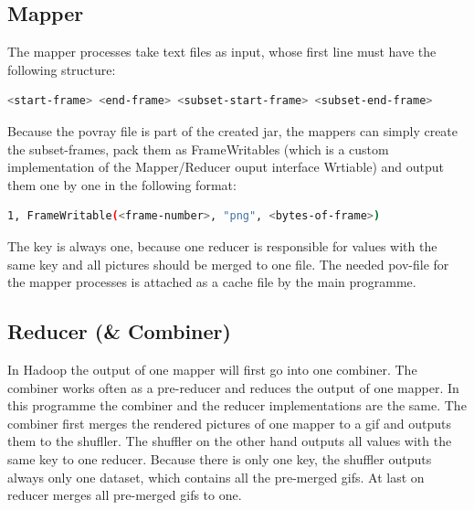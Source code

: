 \documentclass{article}
\begin{document}
\subsection{Mapper}

The mapper processes take text files as input, whose first line must have the following structure:

\begin{lstlisting}[language=bash, deletekeywords={cd}]
  <start-frame> <end-frame> <subset-start-frame> <subset-end-frame>
\end{lstlisting}

Because the povray file is part of the created jar, the mappers can simply create the subset-frames, pack them as FrameWritables (which is a custom implementation of the Mapper/Reducer ouput interface Wrtiable) and output them one by one in the following format:

\begin{lstlisting}[language=bash, deletekeywords={cd}]
  1, FrameWritable(<frame-number>, "png", <bytes-of-frame>)
\end{lstlisting}

The key is always one, because one reducer is responsible for values with the same key and all pictures should be merged to one file.
The needed pov-file for the mapper processes is attached as a cache file by the main programme.

\subsection{Reducer (\& Combiner)}
In Hadoop the output of one mapper will first go into one combiner. The combiner works often as a pre-reducer and reduces the output of one mapper. In this programme the combiner and the reducer implementations are the same. The combiner first merges the rendered pictures of one mapper to a gif and outputs them to the shufller. The shuffler on the other hand outputs all values with the same key to one reducer. Because there is only one key, the shuffler outputs always only one dataset, which contains all the pre-merged gifs. At last on reducer merges all pre-merged gifs to one.
\end{document}
